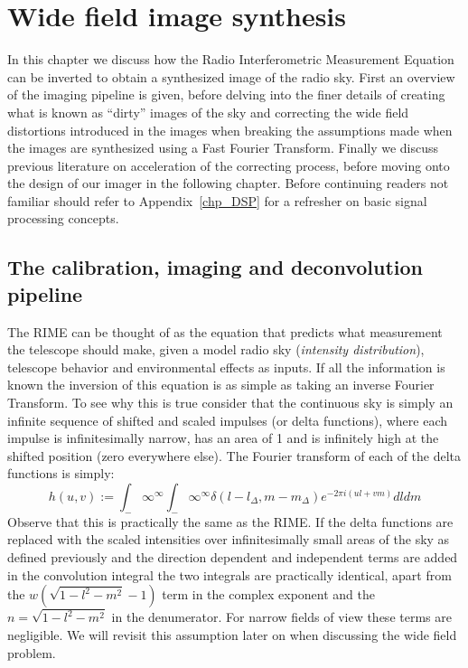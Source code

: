 \chapter{Wide field image synthesis}
In this chapter we discuss how the Radio Interferometric Measurement Equation can be inverted to obtain a synthesized image of the radio sky. First an overview of the imaging pipeline is given, before
delving into the finer details of creating what is known as ``dirty'' images of the sky and correcting the wide field distortions introduced in the images when breaking the assumptions made when the images 
are synthesized using a Fast Fourier Transform. Finally we discuss previous literature on acceleration of the correcting process, before moving onto the design of our imager in the following chapter. Before
continuing readers not familiar should refer to Appendix~\ref{chp_DSP} for a refresher on basic signal processing concepts.
\section{The calibration, imaging and deconvolution pipeline}
The RIME can be thought of as the equation that predicts what measurement the telescope should make, given a model radio sky (\emph{intensity distribution}), telescope behavior and environmental effects as inputs. 
If all the information is known the inversion of this equation is as simple as taking an inverse Fourier Transform. To see why this is true consider that the continuous sky is simply an infinite sequence of 
shifted and scaled impulses (or delta functions), where each impulse is infinitesimally narrow, has an area of 1 and is infinitely high at the shifted position (zero everywhere else). The Fourier transform 
of each of the delta functions is simply:
\begin{equation*}
 h(u,v) := \int_-\infty^\infty\int_-\infty^\infty \delta(l-l_\Delta,m-m_\Delta)e^{-2\pi i(ul+vm)}dldm
\end{equation*}
Observe that this is practically the same as the RIME. If the delta functions are replaced with the scaled intensities over infinitesimally small areas of the sky as defined previously and the direction dependent and
independent terms are added in the convolution integral the two integrals are practically identical, apart from the $w(\sqrt{1-l^2-m^2}-1)$ term in the complex exponent and the $n = \sqrt{1-l^2-m^2}$ in the denumerator. 
For narrow fields of view these terms are negligible. We will revisit this assumption later on when discussing the wide field problem.

